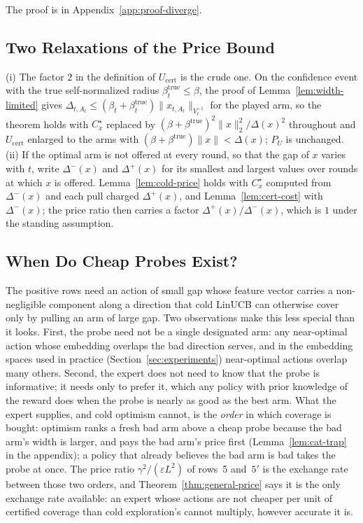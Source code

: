 \documentclass[anon]{alt2027} %
\newcommand{\eps}{\varepsilon}
\begin{document}
The proof is in Appendix~\ref{app:proof-diverge}.


\subsection{Two Relaxations of the Price Bound}
\label{app:relaxations}

\begin{remark}
\label{rem:relaxations}
(i) The factor $2$ in the definition of $U_{\mathrm{cert}}$ is the crude
one. On the confidence event with the true self-normalized radius
$\beta^{\mathrm{true}}_t\le\beta$, the proof of Lemma~\ref{lem:width-limited}
gives $\Delta_{t,A_t}\le(\beta_t+\beta^{\mathrm{true}}_t)\|x_{t,A_t}\|_{V_t^{-1}}$
for the played arm, so the theorem holds with $C^\star_x$ replaced by
$(\beta+\beta^{\mathrm{true}})^2\|x\|_2^2/\Delta(x)^2$ throughout and
$U_{\mathrm{cert}}$ enlarged to the arms with
$(\beta+\beta^{\mathrm{true}})\|x\|<\Delta(x)$; $P_U$ is unchanged. (ii) If the
optimal arm is not offered at every round, so that the gap of $x$ varies
with $t$, write $\Delta^-(x)$ and $\Delta^+(x)$ for its smallest and largest
values over rounds at which $x$ is offered. Lemma~\ref{lem:cold-price} holds
with $C^\star_x$ computed from $\Delta^-(x)$ and each pull charged $\Delta^+(x)$,
and Lemma~\ref{lem:cert-cost} with $\Delta^-(x)$; the price ratio then carries a factor $\Delta^+(x)/\Delta^-(x)$,
which is $1$ under the standing assumption.
\end{remark}

\subsection{When Do Cheap Probes Exist?}
\label{app:cheap-probes}

The positive rows need an action of small gap whose feature vector carries a
non-negligible component along a direction that cold LinUCB can otherwise
cover only by pulling an arm of large gap. Two observations make this less
special than it looks. First, the probe need not be a single designated arm:
any near-optimal action whose embedding overlaps the bad direction serves,
and in the embedding spaces used in practice (Section~\ref{sec:experiments})
near-optimal actions overlap many others. Second, the expert does not need to
know that the probe is informative; it needs only to prefer it, which any
policy with prior knowledge of the reward does when the probe is nearly as
good as the best arm. What the expert supplies, and cold optimism cannot, is
the \emph{order} in which coverage is bought: optimism ranks a fresh bad arm
above a cheap probe because the bad arm's width is larger, and pays the bad
arm's price first (Lemma~\ref{lem:cat-trap} in the appendix); a policy that
already believes the bad arm is bad takes the probe at once. The price ratio
$\gamma^2/(\eps L^2)$ of rows~5 and~$5'$ is the exchange rate between those two
orders, and Theorem~\ref{thm:general-price} says it is the only exchange rate
available: an expert whose actions are not cheaper per unit of certified
coverage than cold exploration's cannot multiply, however accurate it is.
\end{document}
